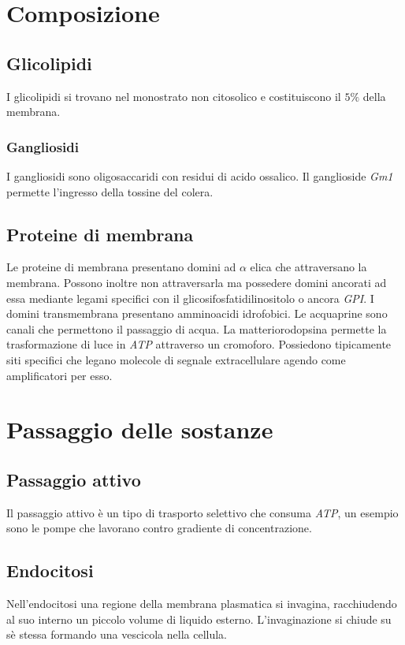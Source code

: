 \section{Composizione}

	\subsection{Glicolipidi}
	I glicolipidi si trovano nel monostrato non citosolico e costituiscono il $5\%$ della membrana.
		
		\subsubsection{Gangliosidi}
		I gangliosidi sono oligosaccaridi con residui di acido ossalico.
		Il ganglioside \emph{Gm1} permette l'ingresso della tossine del colera.

	\subsection{Proteine di membrana}
	Le proteine di membrana presentano domini ad $\alpha$ elica che attraversano la membrana.
	Possono inoltre non attraversarla ma possedere domini ancorati ad essa mediante legami specifici con il glicosifosfatidilinositolo o ancora \emph{GPI}.
	I domini transmembrana presentano amminoacidi idrofobici.
	Le acquaprine sono canali che permettono il passaggio di acqua.
	La matteriorodopsina permette la trasformazione di luce in \emph{ATP} attraverso un cromoforo.
	Possiedono tipicamente siti specifici che legano molecole di segnale extracellulare agendo come amplificatori per esso.

\section{Passaggio delle sostanze}

	\subsection{Passaggio attivo}
	Il passaggio attivo \`e un tipo di trasporto selettivo che consuma \emph{ATP}, un esempio sono le pompe che lavorano contro gradiente di concentrazione.

	\subsection{Endocitosi}
	Nell'endocitosi una regione della membrana plasmatica si invagina, racchiudendo al suo interno un piccolo volume di liquido esterno.
	L'invaginazione si chiude su s\`e stessa formando una vescicola nella cellula.

